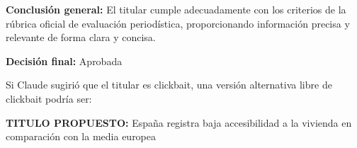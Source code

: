 \documentclass[10pt,a4paper]{article}
\begin{document}
\par\medskip
\textbf{Conclusi\'{o}n general:} El titular cumple adecuadamente con los criterios de la r\'{u}brica oficial de evaluaci\'{o}n period\'{i}stica, proporcionando informaci\'{o}n precisa y relevante de forma clara y concisa.
\par\medskip
\textbf{Decisi\'{o}n final:} Aprobada
\par\medskip
Si Claude sugiri\'{o} que el titular es clickbait, una versi\'{o}n alternativa libre de clickbait podr\'{i}a ser:
\par\medskip
\textbf{TITULO PROPUESTO:} {}Espa\~{n}a registra baja accesibilidad a la vivienda en comparaci\'{o}n con la media europea{}
        \vspace{1em}
\vspace{1em}

\end{document}
